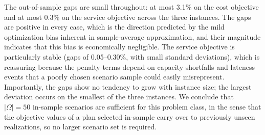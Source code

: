 \documentclass[11pt, a4paper]{article}
\begin{document}
\hypertarget{tab:OOS}{}
\begin{table}[!htb]
\centering
\fontsize{9pt}{9pt}\selectfont
\renewcommand{\arraystretch}{1.5}
\caption{Out-of-sample gap of the E-NSGA-II knee-point solutions (50 in-sample against 500 fresh scenarios)}
\label{tab:oos-performance}
\end{table}
\protect\hypertarget{tab:OOS}{}{}
The out-of-sample gaps are small throughout: at most 3.1\% on the cost objective and at most 0.3\% on the service objective across the three instances. The gaps are positive in every case, which is the direction predicted by the mild optimization bias inherent in sample-average approximation, and their magnitude indicates that this bias is economically negligible. The service objective is particularly stable (gaps of 0.05--0.30\%, with small standard deviations), which is reassuring because the penalty terms depend on capacity shortfalls and lateness events that a poorly chosen scenario sample could easily misrepresent. Importantly, the gaps show no tendency to grow with instance size; the largest deviation occurs on the smallest of the three instances. We conclude that $|\Omega| = 50$ in-sample scenarios are sufficient for this problem class, in the sense that the objective values of a plan selected in-sample carry over to previously unseen realizations, so no larger scenario set is required.
\end{document}
